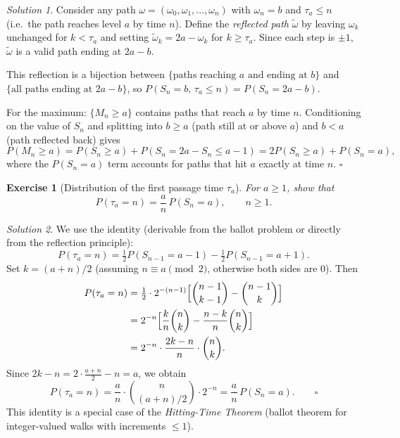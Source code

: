 \documentclass[12pt]{article}
\newtheorem{exercise}{Exercise}
\theoremstyle{remark}
\newtheorem*{solution}{Solution}
\begin{document}
\begin{solution}
Consider any path $\omega = (\omega_0, \omega_1, \ldots, \omega_n)$ with
$\omega_n = b$ and $\tau_a \le n$ (i.e.\ the path reaches level $a$ by time $n$).
Define the \emph{reflected path} $\tilde\omega$ by leaving $\omega_k$ unchanged for
$k < \tau_a$ and setting $\tilde\omega_k = 2a - \omega_k$ for $k \ge \tau_a$.
Since each step is $\pm 1$, $\tilde\omega$ is a valid path ending at $2a - b$.

This reflection is a bijection between
$\{\text{paths reaching } a \text{ and ending at } b\}$ and
$\{\text{all paths ending at } 2a - b\}$,
so $P(S_n = b,\, \tau_a \le n) = P(S_n = 2a - b)$.

For the maximum: $\{M_n \ge a\}$ contains paths that reach $a$ by time $n$.  Conditioning
on the value of $S_n$ and splitting into $b \ge a$ (path still at or above $a$) and
$b < a$ (path reflected back) gives
\[
  P(M_n \ge a) = P(S_n \ge a) + P(S_n = 2a - S_n \le a - 1)
  = 2P(S_n \ge a) + P(S_n = a),
\]
where the $P(S_n = a)$ term accounts for paths that hit $a$ exactly at time $n$.
\hfill$\square$
\end{solution}

\begin{exercise}[Distribution of the first passage time $\tau_a$]
For $a \ge 1$, show that
\[
  P(\tau_a = n) = \frac{a}{n}\,P(S_n = a), \qquad n \ge 1.
\]
\end{exercise}

\begin{solution}
We use the identity (derivable from the ballot problem or directly from the reflection
principle):
\[
  P(\tau_a = n)
  = \tfrac{1}{2}P(S_{n-1} = a-1) - \tfrac{1}{2}P(S_{n-1} = a+1).
\]
Set $k = (a+n)/2$ (assuming $n \equiv a \pmod 2$, otherwise both sides are $0$). Then
\begin{align*}
  P(\tau_a = n)
  &= \tfrac{1}{2} \cdot 2^{-(n-1)} \Bigl[\binom{n-1}{k-1} - \binom{n-1}{k}\Bigr] \\
  &= 2^{-n} \Bigl[\frac{k}{n}\binom{n}{k} - \frac{n-k}{n}\binom{n}{k}\Bigr] \\
  &= 2^{-n} \cdot \frac{2k-n}{n} \cdot \binom{n}{k}.
\end{align*}
Since $2k - n = 2\cdot\frac{a+n}{2} - n = a$, we obtain
\[
  P(\tau_a = n) = \frac{a}{n} \cdot \binom{n}{(a+n)/2} \cdot 2^{-n}
  = \frac{a}{n}\,P(S_n = a). \qquad\square
\]
This identity is a special case of the \emph{Hitting-Time Theorem} (ballot theorem for
integer-valued walks with increments $\le 1$).
\end{solution}
\end{document}
